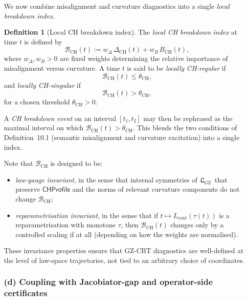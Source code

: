 \documentclass[11pt]{book}
\theoremstyle{plain}
\theoremstyle{definition}
\newtheorem{definition}[theorem]{Definition} \theoremstyle{remark}
\newcommand{\GZLS}{\ensuremath{\mathfrak{L}_{\mathrm{GZ}}}}       \newcommand{\GZLT}{\ensuremath{M_{!w}}}                           \newcommand{\GZLOC}{\ensuremath{A_M}}                             \newcommand{\GZLCurv}{\ensuremath{\mathcal{F}_{\mathrm{law}}}}
\begin{document}
We now combine misalignment and curvature diagnostics into a single
\emph{local breakdown index}.

\begin{definition}[Local CH breakdown index]
The \emph{local CH breakdown index} at time $t$ is defined by
  \[
    \mathcal{B}_{\mathrm{CH}}(t)
    :=
    w_{\Delta}\,\Delta_{\mathrm{CH}}(t)
    +
    w_{B}\,B_{\mathrm{CH}}(t),
  \]
  where $w_{\Delta},w_{B}>0$ are fixed weights determining the relative
  importance of misalignment versus curvature. A time $t$ is said to
  be \emph{locally CH-regular} if
  \[
     \mathcal{B}_{\mathrm{CH}}(t) \le \theta_{\mathrm{CH}},
  \]
  and \emph{locally CH-singular} if
  \[
     \mathcal{B}_{\mathrm{CH}}(t) > \theta_{\mathrm{CH}},
  \]
  for a chosen threshold $\theta_{\mathrm{CH}}>0$.
\end{definition}

A \emph{CH breakdown event} on an interval $[t_1,t_2]$ may then be
rephrased as the maximal interval on which
$\mathcal{B}_{\mathrm{CH}}(t)>\theta_{\mathrm{CH}}$. This blends the
two conditions of Definition~10.1 (semantic misalignment and curvature
excitation) into a single index.

Note that $\mathcal{B}_{\mathrm{CH}}$ is designed to be:

\begin{itemize}
  \item \emph{law-gauge invariant}, in the sense that internal
        symmetries of \GZLS\ that preserve $\mathsf{CHProfile}$ and
        the norms of relevant curvature components do not change
        $\mathcal{B}_{\mathrm{CH}}$;
  \item \emph{reparametrisation invariant}, in the sense that if
        $t\mapsto L_{\mathrm{cont}}(\tau(t))$ is a reparametrisation
        with monotone $\tau$, then
        $\mathcal{B}_{\mathrm{CH}}(t)$ changes only by a controlled
        scaling if at all (depending on how the weights are normalised).
\end{itemize}

These invariance properties ensure that GZ-CBT diagnostics are
well-defined at the level of law-space trajectories, not tied to an
arbitrary choice of coordinates.



\subsubsection*{(d) Coupling with Jacobiator-gap and operator-side certificates}
\end{document}
